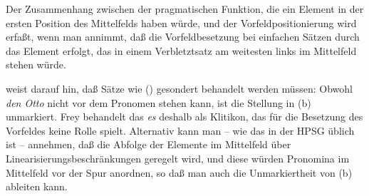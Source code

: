 Der Zusammenhang zwischen der pragmatischen Funktion, die ein Element in der ersten Position des Mittelfelds
haben würde, und der Vorfeldpositionierung wird erfaßt, wenn man annimmt, 
daß die Vorfeldbesetzung bei einfachen Sätzen durch das Element erfolgt,
das in einem Verbletztsatz am weitesten links im Mittelfeld stehen würde.

\citet{Frey2004a} weist darauf hin, daß Sätze wie () gesondert behandelt werden müssen:
\eal
{}
\zl
Obwohl \emph{den Otto} nicht vor dem Pronomen stehen kann, ist die Stellung in (b) unmarkiert.
Frey behandelt das \emph{es} deshalb als Klitikon, das für die Besetzung des Vorfeldes keine Rolle
spielt. Alternativ kann man -- wie das in der HPSG üblich ist -- annehmen, daß die Abfolge der Elemente
im Mittelfeld über Linearisierungsbeschränkungen geregelt wird, und diese würden Pronomina im Mittelfeld
vor der Spur anordnen, so daß man auch die Unmarkiertheit von (b) ableiten kann.%
%
%




